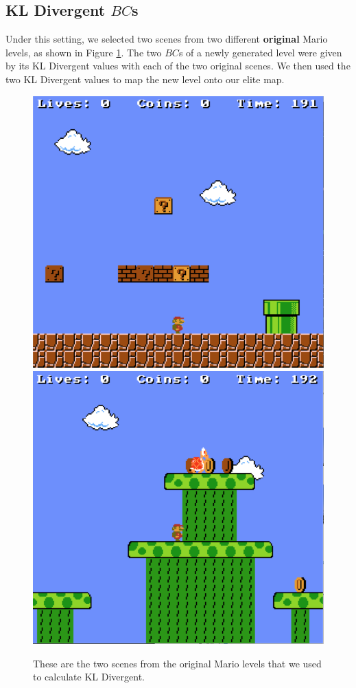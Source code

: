 \documentclass[conference]{IEEEtran}
\begin{document}
\subsection{KL Divergent $BC$s}
Under this setting, we selected two scenes from two different \textbf{original} Mario levels, as shown in Figure \ref{fig:KLDiv}. 
The two $BC$s of a newly generated level were given by its KL Divergent values with each of the two original scenes. We 
then used the two  KL Divergent values to map the new level onto our elite map.\\
\begin{figure}[h!]
    \centering
    \includegraphics[width=0.48\linewidth]{Level1.png}
    \includegraphics[width=0.48\linewidth]{Level3.png}
    \caption{These are the two scenes from the original Mario levels that we used to calculate KL Divergent.}
    \label{fig:KLDiv}
\end{figure}
\end{document}
